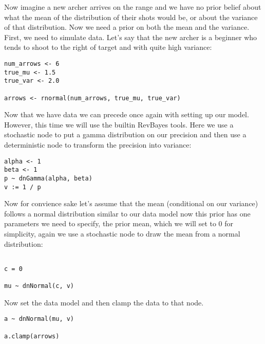 Now imagine a new archer arrives on the range and we have no prior belief about what the mean of the distribution of their shots would be, or about the variance of that distribution. Now we need a prior on both the mean and the variance. First, we need to simulate data. Let's say that the new archer is a beginner who tends to shoot to the right of target and with quite high variance:

{\tt \begin{snugshade*}
\begin{lstlisting}
num_arrows <- 6
true_mu <- 1.5
true_var <- 2.0

arrows <- rnormal(num_arrows, true_mu, true_var)
\end{lstlisting}
\end{snugshade*}}

Now that we have data we can precede once again with setting up our model. However, this time we will use the builtin RevBayes tools. Here we use a stochastic node to put a gamma distribution on our precision and then use a deterministic node to transform the precision into variance:

{\tt \begin{snugshade*}
 \begin{lstlisting}
alpha <- 1
beta <- 1
p ~ dnGamma(alpha, beta)
v := 1 / p
\end{lstlisting}
\end{snugshade*}}

Now for convience sake let's assume that the mean (conditional on our variance) follows a normal distribution similar to our data model now this prior has one parameters we need to specify, the prior mean, which we will set to 0 for simplicity, again we use a stochastic node to draw the mean from a normal distribution:

{\tt \begin{snugshade*}
 \begin{lstlisting}
 
c = 0
 
mu ~ dnNormal(c, v)
\end{lstlisting}
\end{snugshade*}}

Now set the data model and then clamp the data to that node.

{\tt \begin{snugshade*}
 \begin{lstlisting}
a ~ dnNormal(mu, v)

a.clamp(arrows)
\end{lstlisting}
\end{snugshade*}}

